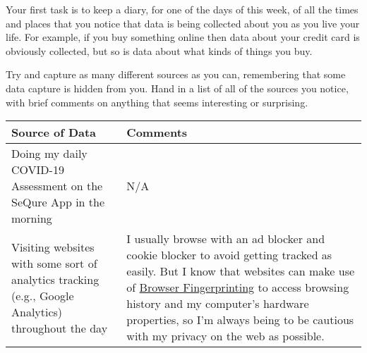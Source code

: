 \documentclass[
  coursecode={CISC/CMPE 251},
  assignmentname={Exercise 1},
  studentnumber=20053722,
  name={Bryan Hoang}
]{
  ltxanswer%
}
\begin{document}
  \begin{questions}
    \question[2]{}
    Your first task is to keep a diary, for one of the days of this week, of all the times and places that you notice that data is being collected about you as you live your life. For example, if you buy something online then data about your credit card is obviously collected, but so is data about what kinds of things you buy.

    Try and capture as many different sources as you can, remembering that some data capture is hidden from you. Hand in a list of all of the sources you notice, with brief comments on anything that seems interesting or surprising.
    \begin{solution}
      \captionsetup{type=table}
      \begin{center}
        \label{tab:1}
        \begin{tabularx}{\textwidth}{
            >{\raggedright\arraybackslash}X
            >{\raggedright\arraybackslash}X}
          \textbf{Source of Data}                                                                                                                         & \textbf{Comments}                                                                                                                                                                                                                                                                                                                                                                     \\
          \toprule
          Doing my daily COVID-19 Assessment on the SeQure App in the morning                                                                             & N/A                                                                                                                                                                                                                                                                                                                                                                                   \\
          \midrule
          Visiting websites with some sort of analytics tracking (e.g., Google Analytics) throughout the day                                              & I usually browse with an ad blocker and cookie blocker to avoid getting tracked as easily. But I know that websites can make use of \href{https://en.wikipedia.org/wiki/Device_fingerprint\#Browser_fingerprint}{Browser Fingerprinting} to access browsing history and my computer's hardware properties, so I'm always being to be cautious with my privacy on the web as possible. \\

\end{tabularx}
\end{center}
\end{solution}
\end{questions}
\end{document}
